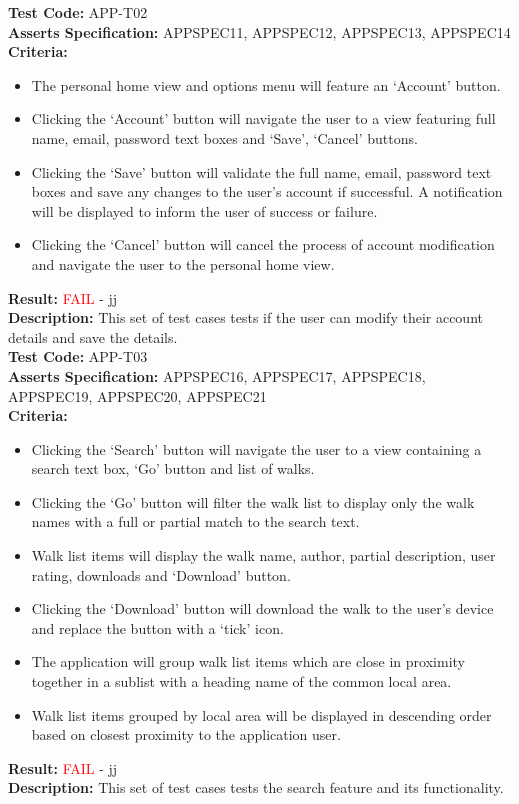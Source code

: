 \documentclass[11pt,a4paper]{report}
\begin{document}
\label{test:APP-T02}
\noindent\textbf{Test Code:} APP-T02\\
\textbf{Asserts Specification:} APPSPEC11, APPSPEC12, APPSPEC13, APPSPEC14\\ 
\textbf{Criteria:} \begin{itemize}
                     \item The personal home view and options menu will feature an `Account' button.
                     \item Clicking the `Account' button will navigate the user to a view featuring full name, email, password text boxes and `Save', `Cancel' buttons.
                     \item Clicking the `Save' button will validate the full name, email, password text boxes and save any changes to the user's account if successful. A notification will be displayed to inform the user of success or failure.
                     \item Clicking the `Cancel' button will cancel the process of account modification and navigate the user to the personal home view. 
                   \end{itemize}
\textbf{Result:} \textcolor{red}{FAIL} - jj\\
\textbf{Description:} This set of test cases tests if the user can modify their account details and save the details.\\

\label{test:APP-T03}
\noindent\textbf{Test Code:} APP-T03\\
\textbf{Asserts Specification:} APPSPEC16, APPSPEC17, APPSPEC18, APPSPEC19, APPSPEC20, APPSPEC21\\ 
\textbf{Criteria:} \begin{itemize}
                     \item Clicking the `Search' button will navigate the user to a view containing a search text box, `Go' button and list of walks.
                     \item Clicking the `Go' button will filter the walk list to display only the walk names with a full or partial match to the search text.
                     \item Walk list items will display the walk name, author, partial description, user rating, downloads and `Download' button.
                     \item Clicking the `Download' button will download the walk to the user's device and replace the button with a `tick' icon.
                     \item The application will group walk list items which are close in proximity together in a sublist with a heading name of the common local area.
                     \item Walk list items grouped by local area will be displayed in descending order based on closest proximity to the application user.
                   \end{itemize}
\textbf{Result:} \textcolor{red}{FAIL} - jj\\
\textbf{Description:} This set of test cases tests the search feature and its functionality. \\
\end{document}
